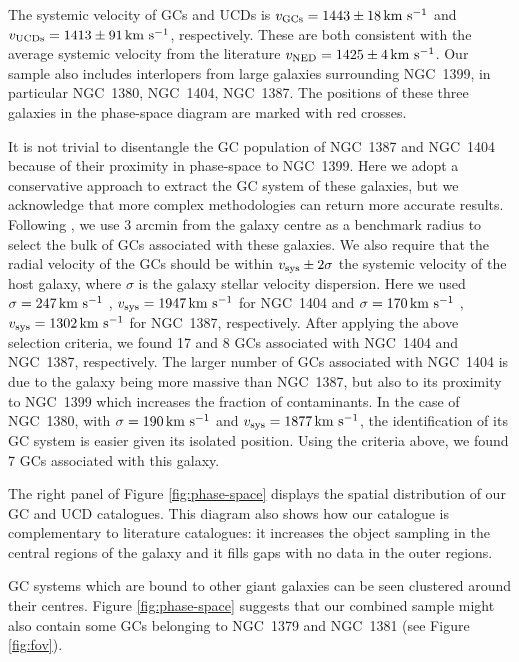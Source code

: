 \documentclass[useAMS,usenatbib]{mn2e}
\newcommand{\kms}{\mbox{\,km~s$^{-1}$}}
\begin{document}
The systemic velocity of GCs and UCDs is $v_{\rm GCs} = 1443 \pm 18 \kms$ and $v_{\rm UCDs} = 1413 \pm 91 \kms$, respectively. These are both consistent with the average systemic velocity from the literature $v_{\rm NED} = 1425 \pm 4 \kms$. Our sample also includes interlopers from large galaxies surrounding NGC~1399, in particular NGC~1380, NGC~1404, NGC~1387. The positions of these three galaxies in the phase-space diagram are marked with red crosses. 

It is not trivial to disentangle the GC population of NGC~1387 and NGC~1404 because of their proximity in phase-space to NGC~1399. 
Here we adopt a conservative approach to extract the GC system of these galaxies, but we acknowledge that more complex methodologies can return more accurate results. Following \citet{Schuberth}, we use 3 arcmin from the galaxy centre as a benchmark radius to select the bulk of GCs associated with these galaxies. We also require that the radial velocity of the GCs should be within $v_{\rm sys} \pm 2\sigma$  the systemic velocity of the host galaxy, where $\sigma$ is the galaxy stellar velocity dispersion. Here we used $\sigma = 247 \kms$  \citep{Vanderbeke11}, $v_{\rm sys} = 1947 \kms$ for NGC~1404 and $\sigma = 170 \kms$ \citep{Wegner03}, $v_{\rm sys} = 1302\kms $ for NGC~1387, respectively. After applying the above selection criteria, we found 17 and 8 GCs associated with NGC~1404 and NGC~1387, respectively. The larger number of GCs associated with NGC~1404 is due to the galaxy being more massive than NGC~1387, but also to its proximity to NGC~1399 which increases the fraction of contaminants.
In the case of NGC~1380, with $\sigma = 190 \kms$  \citep{Vanderbeke11} and $v_{\rm sys} = 1877 \kms$, the identification of its GC system is easier given its isolated position. Using the criteria above, we found 7 GCs associated with this galaxy. 

The right panel of Figure \ref{fig:phase-space} displays the spatial distribution of our GC and UCD catalogues. This diagram also shows how our catalogue is complementary to literature catalogues: it increases the object sampling in the central regions of the galaxy and it fills gaps with no data in the outer regions. 

GC systems which are bound to other giant galaxies can be seen clustered around their centres. Figure \ref{fig:phase-space} suggests that our combined sample might also contain some GCs belonging to NGC~1379 and NGC~1381 (see Figure \ref{fig:fov}). 
\end{document}
